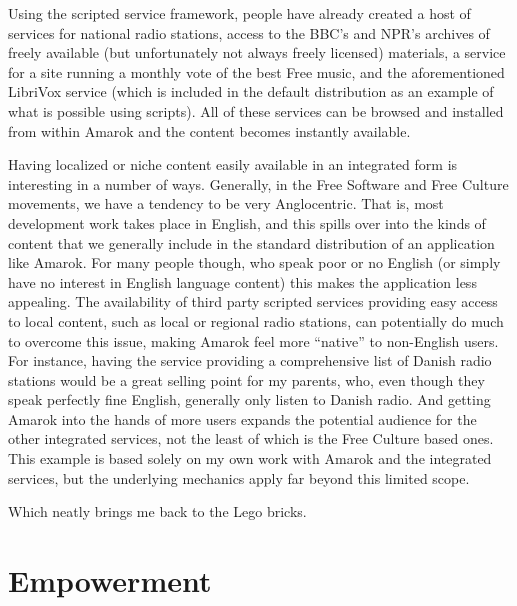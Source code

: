 Using the scripted service framework, people have already created a host of
services for national radio stations, access to the BBC's and NPR's archives of
freely available (but unfortunately not always freely licensed) materials, a
service for a site running a monthly vote of the best Free music, and the
aforementioned LibriVox service (which is included in the default distribution
as an example of what is possible using scripts). All of these services can be
browsed and installed from within Amarok and the content becomes instantly
available.

Having localized or niche content easily available in an integrated form is
interesting in a number of ways. Generally, in the Free Software and Free
Culture movements, we have a tendency to be very Anglocentric. That is, most
development work takes place in English, and this spills over into the kinds of
content that we generally include in the standard distribution of an application
like Amarok. For many people though, who speak poor or no English (or simply
have no interest in English language content) this makes the application less
appealing. The availability of third party scripted services providing easy
access to local content, such as local or regional radio stations, can
potentially do much to overcome this issue, making Amarok feel more ``native''
to non-English users. For instance, having the service providing a comprehensive
list of Danish radio stations would be a great selling point for my parents,
who, even though they speak perfectly f\hbox{}ine English, generally only listen
to Danish radio. And getting Amarok into the hands of more users expands the
potential audience for the other integrated services, not the least of which is
the Free Culture based ones. This example is based solely on my own work with
Amarok and the integrated services, but the underlying mechanics apply far
beyond this limited scope.

Which neatly brings me back to the Lego bricks.


\section{Empowerment}
\label{s:creator_to_consumer:empowerment}

